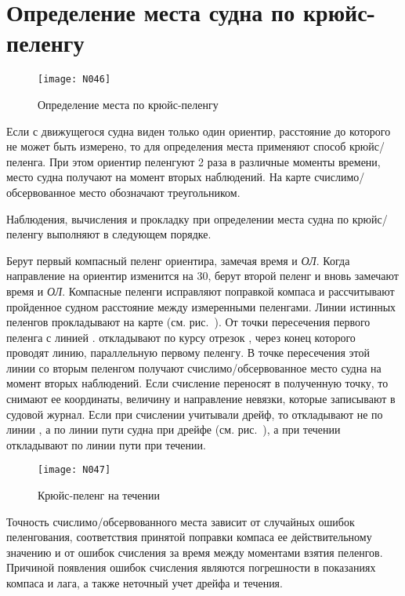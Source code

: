 \section{Определение места судна по крюйс-пеленгу}


\begin{figure}[htb]
  \centering{}
  \texttt{[image: N046]}
  \caption{Определение места по крюйс-пеленгу}
  \label{fig:N46}
\end{figure}

Если с движущегося судна виден только один ориентир, расстояние до
которого не может быть измерено, то для определения места применяют
способ крюйс\-/пеленга. При этом ориентир пеленгуют 2 раза в различные
моменты времени, место судна получают на момент вторых наблюдений. На
карте счислимо\-/обсервованное место обозначают треугольником.

Наблюдения, вычисления и прокладку при определении места судна по
крюйс\-/пеленгу выполняют в следующем порядке.

Берут первый компасный пеленг ориентира, замечая время и
\textit{ОЛ}. Когда направление на ориентир изменится на 30\gr,
берут второй пеленг и вновь замечают время и \textit{ОЛ}. Компасные
пеленги исправляют поправкой компаса и рассчитывают пройденное судном
расстояние между измеренными пеленгами. Линии истинных пеленгов
прокладывают на карте (см. рис.~). От точки пересечения
первого пеленга с линией \IK. откладывают по курсу отрезок
, через конец которого проводят линию, параллельную первому
пеленгу. В точке пересечения этой линии со вторым пеленгом получают
счислимо\-/обсервованное место судна на момент вторых наблюдений. Если
счисление переносят в полученную точку, то снимают ее координаты,
величину и направление невязки, которые записывают в судовой
журнал. Если при счислении учитывали дрейф, то  откладывают
не по линии \IK, а по линии пути судна при дрейфе
(см. рис.~), а при течении откладывают  по линии
пути при течении.

\begin{figure}[htb]
  \centering{}
  \texttt{[image: N047]}
  \caption{Крюйс-пеленг на течении}
  \label{fig:N47}
\end{figure}

Точность счислимо\-/обсервованного места зависит от случайных ошибок
пеленгования, соответствия принятой поправки компаса ее
действительному значению и от ошибок счисления за время между
моментами взятия пеленгов. Причиной появления ошибок счисления
являются погрешности в показаниях компаса и лага, а также неточный
учет дрейфа и течения.

